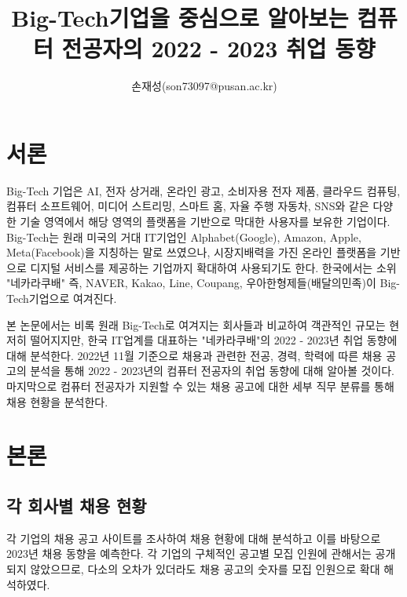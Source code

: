 \documentclass{pnu-survey}
\title{Big-Tech기업을 중심으로 알아보는 컴퓨터 전공자의 2022 - 2023 취업 동향}
\author{손재성(son73097@pusan.ac.kr)}
\begin{document}
\maketitle

\section{서론}

Big-Tech 기업은 AI, 전자 상거래, 온라인 광고, 소비자용 전자 제품, 클라우드 컴퓨팅, 컴퓨터 소프트웨어, 미디어 스트리밍, 스마트 홈, 자율 주행 자동차, SNS와 같은 다양한 기술 영역에서 해당 영역의 플랫폼을 기반으로 막대한 사용자를 보유한 기업이다. Big-Tech는 원래 미국의 거대 IT기업인 Alphabet(Google), Amazon, Apple, Meta(Facebook)을 지칭하는 말로 쓰였으나, 시장지배력을 가진 온라인 플랫폼을 기반으로 디지털 서비스를 제공하는 기업까지 확대하여 사용되기도 한다. 한국에서는 소위 "네카라쿠배" 즉, NAVER, Kakao, Line, Coupang, 우아한형제들(배달의민족)이 Big-Tech기업으로 여겨진다.

본 논문에서는 비록 원래 Big-Tech로 여겨지는 회사들과 비교하여 객관적인 규모는 현저히 떨어지지만, 한국 IT업계를 대표하는 "네카라쿠배"의 2022 - 2023년 취업 동향에 대해 분석한다. 2022년 11월 기준으로 채용과 관련한 전공, 경력, 학력에 따른 채용 공고의 분석을 통해 2022 - 2023년의 컴퓨터 전공자의 취업 동향에 대해 알아볼 것이다. 마지막으로 컴퓨터 전공자가 지원할 수 있는 채용 공고에 대한 세부 직무 분류를 통해 채용 현황을 분석한다.

\section{본론}

\subsection{각 회사별 채용 현황}
각 기업의 채용 공고 사이트를 조사하여 채용 현황에 대해 분석하고 이를 바탕으로 2023년 채용 동향을 예측한다. 각 기업의 구체적인 공고별 모집 인원에 관해서는 공개되지 않았으므로, 다소의 오차가 있더라도 채용 공고의 숫자를 모집 인원으로 확대 해석하였다.
\end{document}
